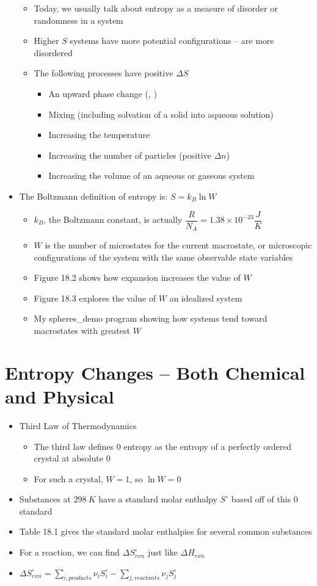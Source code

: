 \documentclass[12pt, openany, letterpaper]{memoir}
\begin{document}
\begin{itemize}
\begin{itemize}
		\item Today, we usually talk about entropy as a measure of disorder or randomness in a system
		\item Higher $S$ systems have more potential configurations -- are more disordered
		\item The following processes have positive $\Delta S$
		\begin{itemize}
			\item An upward phase change (, )
			\item Mixing (including solvation of a solid into aqueous solution)
			\item Increasing the temperature
			\item Increasing the number of particles (positive $\Delta n$)
			\item Increasing the volume of an aqueous or gaseous system
		\end{itemize}
	\end{itemize}
	\item The Boltzmann definition of entropy is: $S=k_B\ln W$
	\begin{itemize}
		\item $k_B$, the Boltzmann constant, is actually $\dfrac{R}{N_A} = 1.38\times10^{-23}\dfrac{J}{K}$
		\item $W$ is the number of microstates for the current macrostate, or microscopic configurations of the system with the same observable state variables
		\item Figure 18.2 shows how expansion increases the value of $W$
		\item Figure 18.3 explores the value of $W$ an idealized system
		\item My spheres\_demo program showing how systems tend toward macrostates with greatest $W$
	\end{itemize}
\end{itemize}
\section{Entropy Changes -- Both Chemical and Physical}
\begin{itemize}
	\item Third Law of Thermodynamics
	\begin{itemize}
		\item The third law defines $0$ entropy as the entropy of a perfectly ordered crystal at absolute $0$
		\item For such a crystal, $W=1$, so $\ln W = 0$		
	\end{itemize}
	\item Substances at $298~K$ have a standard molar enthalpy $S^{\circ}$ based off of this $0$ standard
	\item Table 18.1 gives the standard molar enthalpies for several common substances
	\item For a reaction, we can find $\Delta S^{\circ}_{rxn}$ just like $\Delta H_{rxn}$
	\item  $\displaystyle\Delta S^{\circ}_{rxn} = \sum\limits_{i, products} \nu_iS_i^{\circ} - \sum_{j, reactants} \nu_jS_j^{\circ}$
\end{itemize}
\end{document}
